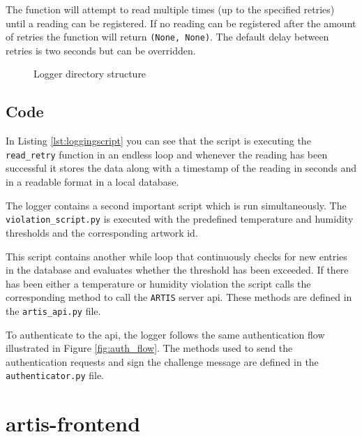 The function will attempt to read multiple times (up to the specified retries) until a reading can be registered. If no reading can be registered after the amount of retries the function will return \texttt{(None, None)}. The default delay between retries is two seconds but can be overridden.

\begin{figure}[h]
    \centering
        
    \caption{Logger directory structure}
    \label{fig:artis-logger-filetree}
\end{figure}

\subsection{Code}


In Listing \ref{lst:loggingscript} you can see that the script is executing the \texttt{read\_retry} function in an endless loop and whenever the reading has been successful it stores the data along with a timestamp of the reading in seconds and in a readable format in a local database.

The logger contains a second important script which is run simultaneously. The \texttt{violation\_script.py} is executed with the predefined temperature and humidity thresholds and the corresponding artwork id.



This script contains another while loop that continuously checks for new entries in the database and evaluates whether the threshold has been exceeded. If there has been either a temperature or humidity violation the script calls the corresponding method to call the \texttt{ARTIS} server \gls{api}. These methods are defined in the \texttt{artis\_api.py} file.

To authenticate to the \gls{api}, the logger follows the same authentication flow illustrated in Figure \ref{fig:auth_flow}. The methods used to send the authentication requests and sign the challenge message are defined in the \texttt{authenticator.py} file.

\clearpage
\section{artis-frontend}
